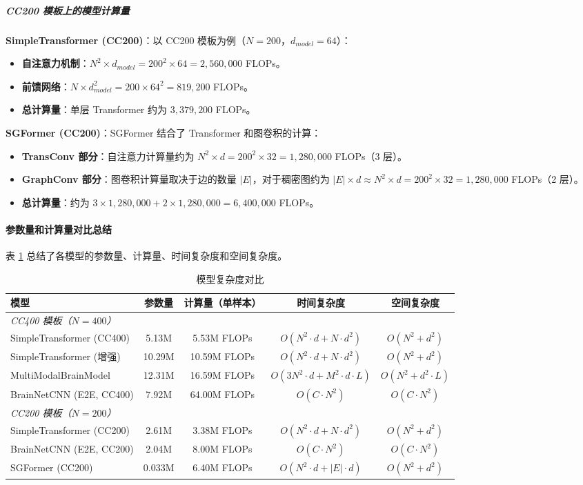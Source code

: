 \documentclass[12pt,a4paper]{article}
\begin{document}
\subparagraph{CC200 模板上的模型计算量}

\textbf{SimpleTransformer (CC200)}：以 CC200 模板为例（$N=200$，$d_{model}=64$）：
\begin{itemize}
\item \textbf{自注意力机制}：$N^2 \times d_{model} = 200^2 \times 64 = 2,560,000$ FLOPs。
\item \textbf{前馈网络}：$N \times d_{model}^2 = 200 \times 64^2 = 819,200$ FLOPs。
\item \textbf{总计算量}：单层 Transformer 约为 $3,379,200$ FLOPs。
\end{itemize}

\textbf{SGFormer (CC200)}：SGFormer 结合了 Transformer 和图卷积的计算：
\begin{itemize}
\item \textbf{TransConv 部分}：自注意力计算量约为 $N^2 \times d = 200^2 \times 32 = 1,280,000$ FLOPs（3 层）。
\item \textbf{GraphConv 部分}：图卷积计算量取决于边的数量 $|E|$，对于稠密图约为 $|E| \times d \approx N^2 \times d = 200^2 \times 32 = 1,280,000$ FLOPs（2 层）。
\item \textbf{总计算量}：约为 $3 \times 1,280,000 + 2 \times 1,280,000 = 6,400,000$ FLOPs。
\end{itemize}

\paragraph{参数量和计算量对比总结}

表 \ref{tab:complexity} 总结了各模型的参数量、计算量、时间复杂度和空间复杂度。

\begin{table}[H]
\centering
\caption{模型复杂度对比}
\label{tab:complexity}
\begin{tabular}{lcccc}
\toprule
模型 & 参数量 & 计算量（单样本） & 时间复杂度 & 空间复杂度 \\
\midrule
\multicolumn{5}{l}{\textit{CC400 模板（$N=400$）}} \\
\midrule
SimpleTransformer (CC400) & 5.13M & 5.53M FLOPs & $O(N^2 \cdot d + N \cdot d^2)$ & $O(N^2 + d^2)$ \\
SimpleTransformer (增强) & 10.29M & 10.59M FLOPs & $O(N^2 \cdot d + N \cdot d^2)$ & $O(N^2 + d^2)$ \\
MultiModalBrainModel & 12.31M & 16.59M FLOPs & $O(3N^2 \cdot d + M^2 \cdot d \cdot L)$ & $O(N^2 + d^2 \cdot L)$ \\
BrainNetCNN (E2E, CC400) & 7.92M & 64.00M FLOPs & $O(C \cdot N^2)$ & $O(C \cdot N^2)$ \\
\midrule
\multicolumn{5}{l}{\textit{CC200 模板（$N=200$）}} \\
\midrule
SimpleTransformer (CC200) & 2.61M & 3.38M FLOPs & $O(N^2 \cdot d + N \cdot d^2)$ & $O(N^2 + d^2)$ \\
BrainNetCNN (E2E, CC200) & 2.04M & 8.00M FLOPs & $O(C \cdot N^2)$ & $O(C \cdot N^2)$ \\
SGFormer (CC200) & 0.033M & 6.40M FLOPs & $O(N^2 \cdot d + |E| \cdot d)$ & $O(N^2 + d^2)$ \\
\bottomrule
\end{tabular}
\end{table}
\end{document}

